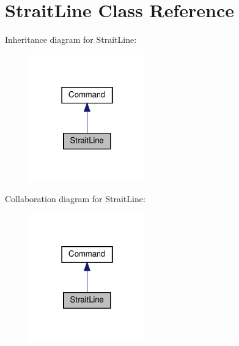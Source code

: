 \hypertarget{classStraitLine}{}\section{Strait\+Line Class Reference}
\label{classStraitLine}


Inheritance diagram for Strait\+Line\+:
\nopagebreak
\begin{figure}[H]
\begin{center}
\leavevmode
\includegraphics[width=142pt]{classStraitLine__inherit__graph}
\end{center}
\end{figure}


Collaboration diagram for Strait\+Line\+:
\nopagebreak
\begin{figure}[H]
\begin{center}
\leavevmode
\includegraphics[width=142pt]{classStraitLine__coll__graph}
\end{center}
\end{figure}
